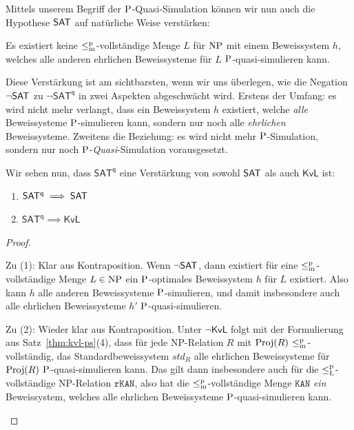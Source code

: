 Mittels unserem Begriff der $\P$-Quasi-Simulation können wir nun auch die Hypothese $\hSAT$ auf natürliche Weise verstärken:
\begin{conjecture}
    Es existiert keine $\leqmp$-vollständige Menge $L$ für $\NP$ mit einem Beweissystem $h$, welches alle anderen ehrlichen Beweissysteme für $L$ $\P$-quasi-simulieren kann. 
\end{conjecture}
Diese Verstärkung ist am sichtbarsten, wenn wir uns überlegen, wie die Negation $\neg\hSAT$ zu $\neg\mathsf{SAT^{q}}$ in zwei Aspekten abgeschwächt wird.
Erstens der Umfang: es wird nicht mehr verlangt, dass ein Beweissystem $h$ existiert, welche \emph{alle} Beweissysteme $\P$-simulieren kann, sondern nur noch alle \emph{ehrlichen} Beweissysteme.
Zweitens die Beziehung: es wird nicht mehr $\P$-Simulation, sondern nur noch $\P$-\emph{Quasi}-Simulation vorausgesetzt.

Wir sehen nun, dass $\mathsf{SAT^{q}}$ eine Verstärkung von sowohl $\hSAT$ als auch $\mathsf{KvL}$ ist:
\begin{corollary}\label{cor:sateff-generalizes-sat}
    \begin{enumerate}
        \item $\mathsf{SAT^{q}}\implies \hSAT$
        \item $\mathsf{SAT^{q}}\implies \mathsf{KvL}$
    \end{enumerate}
\end{corollary}
\begin{proof}
\begin{prooflist}
\item Zu (1): Klar aus Kontraposition. Wenn $\neg\hSAT$, dann existiert für eine $\leqmp$-vollständige Menge $L\in\NP$ ein $\P$-optimales Beweissystem $h$ für $L$ existiert. Also kann $h$ alle anderen Beweissysteme $\P$-simulieren, und damit insbesondere auch alle ehrlichen Beweissysteme $h'$ $\P$-quasi-simulieren.

\item Zu (2): Wieder klar aus Kontraposition. Unter $\neg\mathsf{KvL}$ folgt mit der Formulierung aus Satz~\ref{thm:kvl-ps}(4), dass für jede NP-Relation $R$ mit $\Proj(R)$ $\leqmp$-vollständig, das Standardbeweissystem $\mathit{std}_R$ alle ehrlichen Beweissysteme für $\Proj(R)$ $\P$-quasi-simulieren kann. Das gilt dann insbesondere auch für die $\leqlp$-vollständige NP-Relation $\mathtt{rKAN}$, also hat die $\leqmp$-vollständige Menge $\mathtt{KAN}$ \emph{ein} Beweissystem, welches alle ehrlichen Beweissysteme $\P$-quasi-simulieren kann.
\end{prooflist}
\end{proof}

